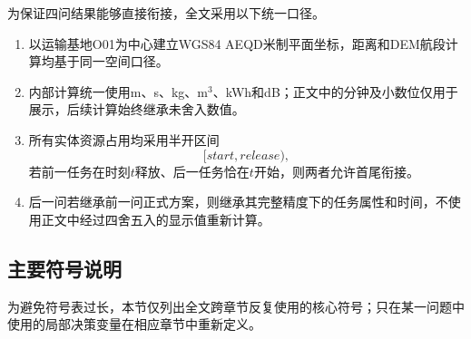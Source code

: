 \documentclass[UTF8,a4paper,12pt]{ctexart}
\begin{document}
为保证四问结果能够直接衔接，全文采用以下统一口径。

\begin{enumerate}[label=(\arabic*),leftmargin=3.0em]
\item 以运输基地O01为中心建立WGS84 AEQD米制平面坐标，距离和DEM航段计算均基于同一空间口径。
\item 内部计算统一使用m、s、kg、m$^3$、kWh和dB；正文中的分钟及小数位仅用于展示，后续计算始终继承未舍入数值。
\item 所有实体资源占用均采用半开区间
\[
[start,release),
\]
若前一任务在时刻$t$释放、后一任务恰在$t$开始，则两者允许首尾衔接。
\item 后一问若继承前一问正式方案，则继承其完整精度下的任务属性和时间，不使用正文中经过四舍五入的显示值重新计算。
\end{enumerate}

\subsection{主要符号说明}

为避免符号表过长，本节仅列出全文跨章节反复使用的核心符号；只在某一问题中使用的局部决策变量在相应章节中重新定义。
\end{document}
